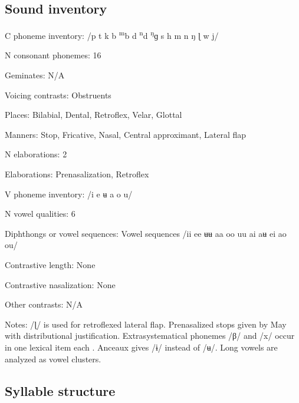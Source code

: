{\subsection*{Sound inventory}
\begin{appendixdesc}

\item[C phoneme inventory:] /p t k b \textsuperscript{m}b d \textsuperscript{n}d \textsuperscript{ŋ}ɡ s h m n ŋ ɭ w j/

\item[N consonant phonemes:] 16

\item[Geminates:] N/A

\item[Voicing contrasts:] Obstruents

\item[Places:] Bilabial, Dental, Retroflex, Velar, Glottal

\item[Manners:] Stop, Fricative, Nasal, Central approximant, Lateral flap

\item[N elaborations:] 2

\item[Elaborations:] Prenasalization, Retroflex

\item[V phoneme inventory:] /i e ʉ a o u/

\item[N vowel qualities:] 6

\item[Diphthongs or vowel sequences:] Vowel sequences /ii ee ʉʉ aa oo uu ai aʉ ei ao ou/

\item[Contrastive length:] None

\item[Contrastive nasalization:] None

\item[Other contrasts:] N/A

\item[Notes:] /ɭ/ is used for retroflexed lateral flap. Prenasalized stops given by May with distributional justification. Extrasystematical phonemes /β/ and /x/ occur in one lexical item each \citep[9]{Anceaux1965}. Anceaux gives /ɨ/ instead of /ʉ/. Long vowels are analyzed as vowel clusters.
\end{appendixdesc}
\subsection*{Syllable structure}
\begin{appendixdesc}


\end{appendixdesc}}
